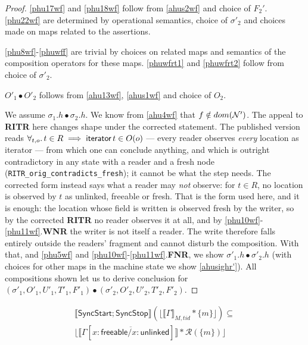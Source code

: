 \begin{proof}
\ref{phu17wf} and \ref{phu18wf} follow from \ref{ahus2wf} and choice of $F_2'$.  \ref{phu22wf} are determined by operational semantics, choice of $\sigma'_2$ and choices made on maps related to the assertions.

\ref{phu8wf}-\ref{phuwff} are trivial by choices on related maps and semantics of the composition operators for these maps. \ref{phuwfrt1} and \ref{phuwfrt2} follow from choice of $\sigma'_2$.

$O'_1 \bullet O'_2 $ follows from \ref{ahu13wf}, \ref{ahus1wf} and choice of $O_2$. 

We assume $\sigma_1.h \bullet \sigma_2.h$. We know from \ref{ahu4wf} that $f \notin dom(\mathcal{N}')$.  The appeal to \textbf{RITR} here changes shape under the corrected statement.  The published version reads $\forall_{t,o}\ldotp t \in R \implies \textsf{iterator}\,t \in O(o)$ --- every reader observes \emph{every} location as \textsf{iterator} --- from which one can conclude anything, and which is outright contradictory in any state with a reader and a fresh node (\texttt{RITR\_orig\_contradicts\_fresh}); it cannot be what the step needs.  The corrected form instead says what a reader may \emph{not} observe: for $t \in R$, no location is observed by $t$ as \textsf{unlinked}, \textsf{freeable} or \textsf{fresh}.  That is the form used here, and it is enough: the location whose field is written is observed \textsf{fresh} by the writer, so by the corrected \textbf{RITR} no reader observes it at all, and by \ref{phu10wf}-\ref{phu11wf}.\textbf{WNR} the writer is not itself a reader.  The write therefore falls entirely outside the readers' fragment and cannot disturb the composition.  With that, and \ref{phu5wf} and \ref{phu10wf}-\ref{phu11wf}.\textbf{FNR}, we show $\sigma'_1.h \bullet \sigma'_2.h$ (with choices for other maps in the machine state we show \ref{ahusighr'}). All compositions shown  let us to derive conclusion for $(\sigma'_1, O'_1, U'_1, T'_1,F'_1) \bullet (\sigma'_2, O'_2, U'_2, T'_2,F'_2) $.
 \end{proof}
\begin{lemma}
   \label{lemma:syncstop}
   \begin{align*}
  \llbracket  \textsf{SyncStart};\textsf{SyncStop} \rrbracket (\lfloor \llbracket \Gamma  \rrbracket_{M,tid} * \{m\}\rfloor)  \subseteq \\
                                                              \lfloor \llbracket \Gamma[\overline{x:\textsf{freeable}/x:\textsf{unlinked}}] \rrbracket  * \mathcal{R}(\{m\})\rfloor
\end{align*}
 \end{lemma}
